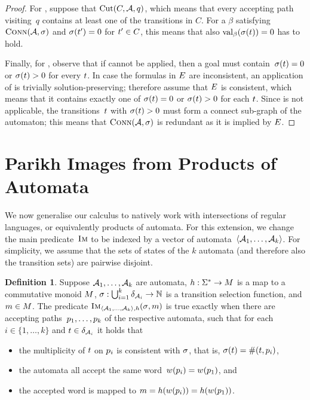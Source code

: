 \documentclass[acmsmall,review,anonymous,screen]{acmart}\settopmatter{printfolios=true,printccs=true,printacmref=true}
\theoremstyle{definition}
\newtheorem{definition}{Definition}[section]
\begin{document}
\begin{proof}
  For \Propagate{}, suppose that
  $\operatorname{Cut}(C, \mathcal{A}, q)$, which means that every
  accepting path visiting~$q$ contains at least one of the transitions
  in $C$. For a $\beta$ satisfying $\operatorname{\textsc{Conn}}(\mathcal{A}, \operatorname{\sigma})$
  and $\operatorname{\sigma}(t') = 0$ for $t' \in C$, this means
  that also $\operatorname{val}_\beta(\operatorname{\sigma}(t)) = 0$ has to hold.

  Finally, for \Subsume{}, observe that if \Split{} cannot be applied,
  then a goal must contain~$\operatorname{\sigma}(t) = 0$ or
  $\operatorname{\sigma}(t) > 0$ for every $t$. In case the
  formulas in $E$ are inconsistent, an application of
  \Subsume{} is trivially solution-preserving; therefore assume that
  $E$ is consistent, which means that it contains
  exactly one of $\operatorname{\sigma}(t) = 0$ or
  $\operatorname{\sigma}(t) > 0$ for each $t$. Since
  \Propagate{} is not applicable, the transitions~$t$ with
  $\operatorname{\sigma}(t) > 0$ must form a connect sub-graph of the
  automaton; this means that $\operatorname{\textsc{Conn}}(\mathcal{A}, \operatorname{\sigma})$ is
  redundant as it is implied by $E$.
\end{proof}


\section{Parikh Images from Products of Automata}\label{sec:multiple}

We now generalise our calculus to natively work with intersections of
regular languages, or equivalently products of automata. For this
extension, we change the main predicate~$\operatorname{\textsc{Im}}$ to be indexed by a
vector of automata~$\left\langle\mathcal{A}_1, \ldots, \mathcal{A}_k\right\rangle$.  For
simplicity, we assume that the sets of states of the $k$ automata (and
therefore also the transition sets) are pairwise disjoint. 
\begin{definition}\label{def:multiple}
  Suppose $\mathcal{A}_1, \ldots, \mathcal{A}_k$ are automata,
  $h : \Sigma^* \to M$ is a map to a commutative monoid
  $M$,
  $\operatorname{\sigma}: \bigcup_{i=1}^k \delta_{\mathcal{A}_i} \to \mathbb{N}$
  is a transition selection function, and
  $m \in M$. The predicate
  $\operatorname{\textsc{Im}}_{\left\langle\mathcal{A}_1, \ldots,
      \mathcal{A}_k\right\rangle, h}(\operatorname{\sigma}, m)$ is true exactly
  when there are accepting paths~$p_1, \ldots, p_k$ of the
  respective automata, such that for each $i \in \{1, \ldots, k\}$ and
  $t \in \delta_{\mathcal{A}_i}$ it holds that
  \begin{itemize}
  \item the multiplicity of $t$ on $p_i$ is consistent with
    $\operatorname{\sigma}$, that is,
    $\operatorname{\sigma}(t) = \operatorname{\#}(t, p_i)$,
  \item the automata all accept the same
    word~$w(p_i) = w(p_1)$, and
  \item the accepted word is mapped to
    $m = h(w(p_i)) =
    h(w(p_1))$.
  \end{itemize}
\end{definition}
\end{document}
